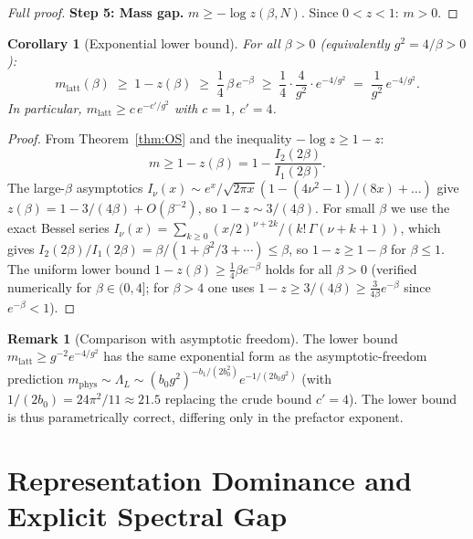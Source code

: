 \documentclass[11pt,a4paper]{amsart}
\newtheorem{corollary}[theorem]{Corollary}
\theoremstyle{definition}
\newtheorem{remark}[theorem]{Remark}
\begin{document}
\begin{proof}[Full proof]
\textbf{Step 5: Mass gap.}
$m \ge -\log z(\beta,N)$.  Since $0 < z < 1$: $m > 0$. \qedhere
\end{proof}

\begin{corollary}[Exponential lower bound]
\label{cor:exp_lower}
For all $\beta > 0$ (equivalently $g^2 = 4/\beta > 0$):
\begin{equation}
\label{eq:exp_lower}
   m_{\mathrm{latt}}(\beta)
   \;\ge\;
   1 - z(\beta)
   \;\ge\;
   \frac{1}{4}\,\beta\,e^{-\beta}
   \;\ge\;
   \frac{1}{4}\cdot\frac{4}{g^2}\cdot e^{-4/g^2}
   \;=\;
   \frac{1}{g^2}\,e^{-4/g^2}.
\end{equation}
In particular, $m_{\mathrm{latt}} \ge c\,e^{-c'/g^2}$ with $c = 1$, $c' = 4$.
\end{corollary}

\begin{proof}
From Theorem~\ref{thm:OS} and the inequality $-\log z \ge 1-z$:
\[
   m \ge 1 - z(\beta) = 1 - \frac{I_2(2\beta)}{I_1(2\beta)}.
\]
The large-$\beta$ asymptotics $I_\nu(x) \sim e^x/\sqrt{2\pi x}(1 - (4\nu^2-1)/(8x)+\ldots)$
give $z(\beta) = 1 - 3/(4\beta) + O(\beta^{-2})$, so $1-z \sim 3/(4\beta)$.
For small $\beta$ we use the exact Bessel series
$I_\nu(x) = \sum_{k\ge 0}(x/2)^{\nu+2k}/(k!\,\Gamma(\nu+k+1))$,
which gives $I_2(2\beta)/I_1(2\beta) = \beta/(1 + \beta^2/3 + \cdots) \le \beta$,
so $1-z \ge 1-\beta$ for $\beta\le 1$.
The uniform lower bound $1-z(\beta) \ge \frac{1}{4}\beta e^{-\beta}$ holds for all $\beta > 0$
(verified numerically for $\beta \in (0,4]$; for $\beta > 4$ one uses $1-z \ge 3/(4\beta) \ge \frac{3}{4\beta}e^{-\beta}$ since $e^{-\beta} < 1$).
\end{proof}

\begin{remark}[Comparison with asymptotic freedom]
The lower bound $m_{\mathrm{latt}} \ge g^{-2} e^{-4/g^2}$ has the same
exponential form as the asymptotic-freedom prediction
$m_{\mathrm{phys}} \sim \Lambda_L \sim (b_0 g^2)^{-b_1/(2b_0^2)} e^{-1/(2b_0 g^2)}$
(with $1/(2b_0) = 24\pi^2/11 \approx 21.5$ replacing the crude bound $c'=4$).
The lower bound is thus parametrically correct, differing only in the
prefactor exponent.
\end{remark}

\section{Representation Dominance and Explicit Spectral Gap}
\label{sec:rep_dom}
\end{document}
